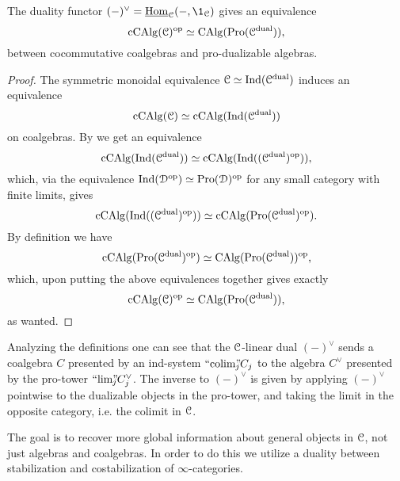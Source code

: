 \begin{lemma}
    \label{ch2:lm:sweedler-duality}
    The duality functor $(-)^\vee = \iHom_\C(-,\1_\C)$ gives an equivalence 
    \[\operatorname{cCAlg}(\EuScript{C})^{\mathrm{op}}\simeq \operatorname{CAlg}(\operatorname{Pro}(\EuScript{C}^{\mathrm{dual}})),\]
    between cocommutative coalgebras and pro-dualizable algebras.
\end{lemma}
\begin{proof}
    The symmetric monoidal equivalence $\EuScript{C}\simeq \operatorname{Ind}(\EuScript{C}^{\mathrm{dual}})$ induces an equivalence 
    \[\operatorname{cCAlg}(\EuScript{C}) \simeq \operatorname{cCAlg}(\operatorname{Ind}(\EuScript{C}^{\mathrm{dual}}))\]
    on coalgebras. By \cite[3.2.4]{lurie_2018_ELL1} we get an equivalence 
    \[\operatorname{cCAlg}(\operatorname{Ind}(\EuScript{C}^{\mathrm{dual}}))\simeq \operatorname{cCAlg}(\operatorname{Ind}((\EuScript{C}^{\mathrm{dual}})^{\mathrm{op}})),\]
    which, via the equivalence $\operatorname{Ind}(\EuScript{D}^{\mathrm{op}})\simeq \operatorname{Pro}(\EuScript{D})^{\mathrm{op}}$ for any small category with finite limits, gives 
    \[\operatorname{cCAlg}(\operatorname{Ind}((\EuScript{C}^{\mathrm{dual}})^{\mathrm{op}}))\simeq \operatorname{cCAlg}(\operatorname{Pro}(\EuScript{C}^{\mathrm{dual}})^{\mathrm{op}}).\]
    By definition we have 
    \[\operatorname{cCAlg}(\operatorname{Pro}(\EuScript{C}^{\mathrm{dual}})^{\mathrm{op}})\simeq \operatorname{CAlg}(\operatorname{Pro}(\EuScript{C}^{\mathrm{dual}}))^{\mathrm{op}},\]
    which, upon putting the above equivalences together gives exactly 
    \[\operatorname{cCAlg}(\EuScript{C})^{\mathrm{op}}\simeq \operatorname{CAlg}(\operatorname{Pro}(\EuScript{C}^{\mathrm{dual}})),\]
    as wanted. 
\end{proof}

\begin{remark}
    \label{ch2:rm:coalebra-in-Ind}
    Analyzing the definitions one can see that the $\EuScript{C}$-linear dual $(-)^\vee$ sends a coalgebra $C$ presented by an ind-system $``\!\operatorname{colim}\!"_{\hspace{-5pt} j} C_j$ to the algebra $C^\vee$ presented by the pro-tower $``\!\lim\!"_{\hspace{-5pt} j} C_j^\vee$. The inverse to $(-)^\vee$ is given by applying $(-)^\vee$ pointwise to the dualizable objects in the pro-tower, and taking the limit in the opposite category, i.e. the colimit in $\EuScript{C}$. 
\end{remark}

The goal is to recover more global information about general objects in $\EuScript{C}$, not just algebras and coalgebras. In order to do this we utilize a duality between stabilization and costabilization of $\infty$-categories. 

